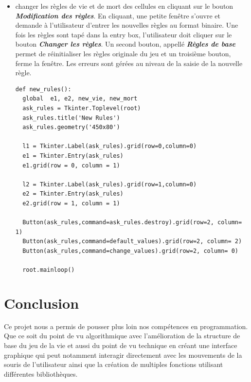 \documentclass{article}
\begin{document}
\begin{itemize}
\item changer les règles de vie et de mort des cellules en cliquant sur le bouton \textbf{\textit{Modification des règles}}. En cliquant, une petite fenêtre s'ouvre et demande à l'utilisateur d'entrer les nouvelles règles au format binaire. Une fois les règles sont tapé dans la entry box, l'utilisateur doit cliquer sur le bouton \textbf{\textit{Changer les règles}}. Un second bouton, appellé \textbf{\textit{Règles de base}} permet de réinitialiser les règles originale du jeu et un troisième bouton,  ferme la fenêtre. Les erreurs sont gérées au niveau de la saisie de la nouvelle règle.

\begin{verbatim}
def new_rules():
  global  e1, e2, new_vie, new_mort
  ask_rules = Tkinter.Toplevel(root)
  ask_rules.title('New Rules')
  ask_rules.geometry('450x80')
 
  l1 = Tkinter.Label(ask_rules).grid(row=0,column=0)
  e1 = Tkinter.Entry(ask_rules)
  e1.grid(row = 0, column = 1)
 
  l2 = Tkinter.Label(ask_rules).grid(row=1,column=0)
  e2 = Tkinter.Entry(ask_rules)
  e2.grid(row = 1, column = 1)
 
  Button(ask_rules,command=ask_rules.destroy).grid(row=2, column= 1)
  Button(ask_rules,command=default_values).grid(row=2, column= 2)
  Button(ask_rules,command=change_values).grid(row=2, column= 0)
 
  root.mainloop()
\end{verbatim}

\end{itemize}

\section*{Conclusion}

Ce projet nous a permis de pousser plus loin nos compétences en programmation.\\
Que ce soit du point de vu algorithmique avec l’amélioration de la structure de base du jeu de la vie et aussi du point de vu technique en créant une interface graphique qui peut notamment interagir directement avec les mouvements de la souris de l'utilisateur ainsi que la création de multiples fonctions utilisant différentes bibliothèques.
\end{document}
